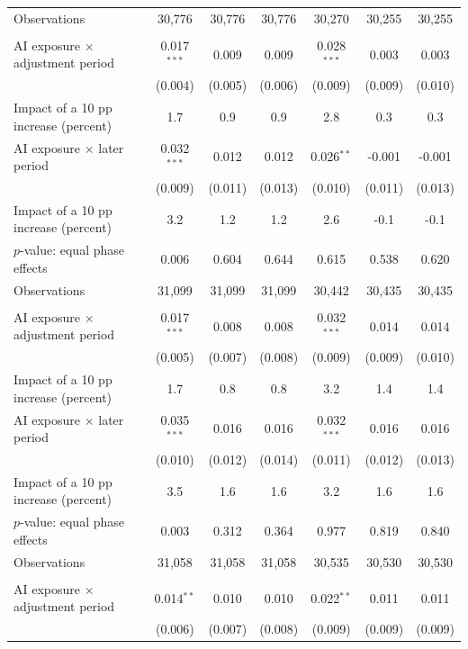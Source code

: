 \begin{table}[p]
\begin{threeparttable}
\begin{tabular}{@{}lcccccc@{}}
Observations & 30,776 & 30,776 & 30,776 & 30,270 & 30,255 & 30,255 \\
\addlinespace[1pt]
\multicolumn{7}{l}{\textbf{Panel C. Age: 40 or older}} \\
AI exposure $\times$ adjustment period & 0.017$^{***}$ & 0.009 & 0.009 & 0.028$^{***}$ & 0.003 & 0.003 \\
 & (0.004) & (0.005) & (0.006) & (0.009) & (0.009) & (0.010) \\
Impact of a 10 pp increase (percent) & 1.7 & 0.9 & 0.9 & 2.8 & 0.3 & 0.3 \\
\addlinespace
AI exposure $\times$ later period & 0.032$^{***}$ & 0.012 & 0.012 & 0.026$^{**}$ & -0.001 & -0.001 \\
 & (0.009) & (0.011) & (0.013) & (0.010) & (0.011) & (0.013) \\
Impact of a 10 pp increase (percent) & 3.2 & 1.2 & 1.2 & 2.6 & -0.1 & -0.1 \\
$p$-value: equal phase effects & 0.006 & 0.604 & 0.644 & 0.615 & 0.538 & 0.620 \\
Observations & 31,099 & 31,099 & 31,099 & 30,442 & 30,435 & 30,435 \\
\addlinespace[1pt]
\multicolumn{7}{l}{\textbf{Panel D. Gender: men}} \\
AI exposure $\times$ adjustment period & 0.017$^{***}$ & 0.008 & 0.008 & 0.032$^{***}$ & 0.014 & 0.014 \\
 & (0.005) & (0.007) & (0.008) & (0.009) & (0.009) & (0.010) \\
Impact of a 10 pp increase (percent) & 1.7 & 0.8 & 0.8 & 3.2 & 1.4 & 1.4 \\
\addlinespace
AI exposure $\times$ later period & 0.035$^{***}$ & 0.016 & 0.016 & 0.032$^{***}$ & 0.016 & 0.016 \\
 & (0.010) & (0.012) & (0.014) & (0.011) & (0.012) & (0.013) \\
Impact of a 10 pp increase (percent) & 3.5 & 1.6 & 1.6 & 3.2 & 1.6 & 1.6 \\
$p$-value: equal phase effects & 0.003 & 0.312 & 0.364 & 0.977 & 0.819 & 0.840 \\
Observations & 31,058 & 31,058 & 31,058 & 30,535 & 30,530 & 30,530 \\
\addlinespace[1pt]
\multicolumn{7}{l}{\textbf{Panel E. Gender: women}} \\
AI exposure $\times$ adjustment period & 0.014$^{**}$ & 0.010 & 0.010 & 0.022$^{**}$ & 0.011 & 0.011 \\
 & (0.006) & (0.007) & (0.008) & (0.009) & (0.009) & (0.009) \\

\end{tabular}
\end{threeparttable}
\end{table}
